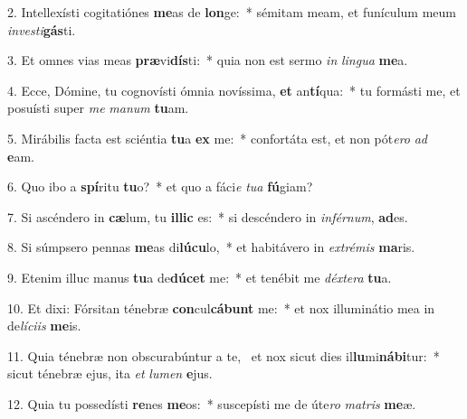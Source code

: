 2. Intellexísti cogitatiónes \textbf{me}as de \textbf{lon}ge:~*  sémitam meam, et funículum meum \textit{in}\textit{ves}\textit{ti}\textbf{gás}ti.\

3. Et omnes vias meas \textbf{præ}vi\textbf{dís}ti:~*  quia non est sermo \textit{in} \textit{lin}\textit{gua} \textbf{me}a.\

4. Ecce, Dómine, tu cognovísti ómnia novíssima, \textbf{et} an\textbf{tí}qua:~*  tu formásti me, et posuísti super \textit{me} \textit{ma}\textit{num} \textbf{tu}am.\

5. Mirábilis facta est sciéntia \textbf{tu}a \textbf{ex} me:~*  confortáta est, et non pót\textit{e}\textit{ro} \textit{ad} \textbf{e}am.\

6. Quo ibo a \textbf{spí}ritu \textbf{tu}o?~*  et quo a fáci\textit{e} \textit{tu}\textit{a} \textbf{fú}giam?\

7. Si ascéndero in \textbf{cæ}lum, tu \textbf{il}\textbf{lic} es:~*  si descéndero in \textit{in}\textit{fér}\textit{num}, \textbf{ad}es.\

8. Si súmpsero pennas \textbf{me}as di\textbf{lú}\textbf{cu}lo,~*  et habitávero in \textit{ex}\textit{tré}\textit{mis} \textbf{ma}ris.\

9. Etenim illuc manus \textbf{tu}a de\textbf{dú}\textbf{cet} me:~*  et tenébit me \textit{déx}\textit{te}\textit{ra} \textbf{tu}a.\

10. Et dixi: Fórsitan ténebræ \textbf{con}cul\textbf{cá}\textbf{bunt} me:~*  et nox illuminátio mea in de\textit{lí}\textit{ci}\textit{is} \textbf{me}is.\

11. Quia ténebræ non obscurabúntur a te, \dag\  et nox sicut dies il\textbf{lu}mi\textbf{ná}\textbf{bi}tur:~*  sicut ténebræ ejus, ita \textit{et} \textit{lu}\textit{men} \textbf{e}jus.\

12. Quia tu possedísti \textbf{re}nes \textbf{me}os:~*  suscepísti me de úte\textit{ro} \textit{ma}\textit{tris} \textbf{me}æ.\

